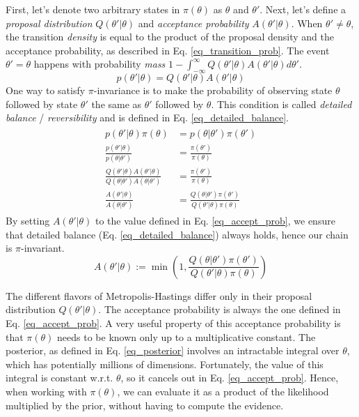 \documentclass[12pt]{article}
\begin{document}
First, let's denote two arbitrary states in $\pi(\theta)$ as $\theta$ and $\theta'$. Next, let's define a \textit{proposal distribution} $Q(\theta'|\theta)$ and \textit{acceptance probability} $A(\theta'|\theta)$. When $\theta' \ne \theta$, the transition \textit{density} is equal to the product of the proposal density and the acceptance probability, as described in Eq. \ref{eq_transition_prob}. The event $\theta' = \theta$ happens with probability \textit{mass} $1-\int_{-\infty}^{\infty} Q(\theta'|\theta)A(\theta'|\theta) d\theta'$.
\begin{equation}
p(\theta'|\theta) = Q(\theta'|\theta)A(\theta'|\theta)
\label{eq_transition_prob}
\end{equation}
One way to satisfy $\pi$-invariance is to make the probability of observing state $\theta$ followed by state $\theta'$ the same as $\theta'$ followed by $\theta$. This condition is called \textit{detailed balance} / \textit{reversibility} and is defined in Eq. \ref{eq_detailed_balance}.
\begin{align}
\begin{split}
p(\theta'|\theta)\pi(\theta) &= p(\theta|\theta')\pi(\theta') \\
\frac{p(\theta'|\theta)}{p(\theta|\theta')} &= \frac{\pi(\theta')}{\pi(\theta)} \\
\frac{Q(\theta'|\theta)A(\theta'|\theta)}{Q(\theta|\theta')A(\theta|\theta')} &= \frac{\pi(\theta')}{\pi(\theta)} \\
\frac{A(\theta'|\theta)}{A(\theta|\theta')} &= \frac{Q(\theta|\theta')\pi(\theta')}{Q(\theta'|\theta)\pi(\theta)}
\label{eq_detailed_balance}
\end{split}
\end{align}
By setting $A(\theta'|\theta)$ to the value defined in Eq. \ref{eq_accept_prob}, we ensure that detailed balance (Eq. \ref{eq_detailed_balance}) always holds, hence our chain is $\pi$-invariant. 
\begin{equation}
A(\theta'|\theta) := \min \left(1, \frac{Q(\theta|\theta')\pi(\theta')}{Q(\theta'|\theta)\pi(\theta)} \right)
\label{eq_accept_prob}
\end{equation}

The different flavors of Metropolis-Hastings differ only in their proposal distribution $Q(\theta'|\theta)$. The acceptance probability is always the one defined in Eq. \ref{eq_accept_prob}. A very useful property of this acceptance probability is that $\pi(\theta)$ needs to be known only up to a multiplicative constant. The posterior, as defined in Eq. \ref{eq_posterior} involves an intractable integral over $\theta$, which has potentially millions of dimensions. Fortunately, the value of this integral is constant w.r.t. $\theta$, so it cancels out in Eq. \ref{eq_accept_prob}. Hence, when working with $\pi(\theta)$, we can evaluate it as a product of the likelihood multiplied by the prior, without having to compute the evidence.
\end{document}
